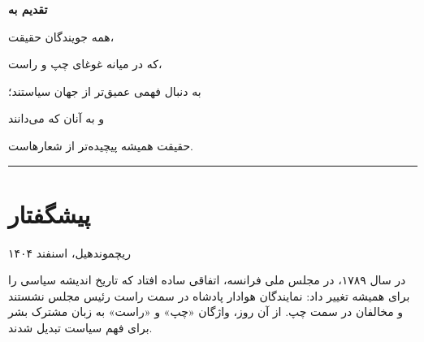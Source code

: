 \vspace*{\fill}

\cleardoublepage


\thispagestyle{empty}

\vspace*{4cm}

\begin{flushright}
\begin{minipage}{10cm}

{\Large\bfseries تقدیم به}

\vspace{20pt}

{\large
همه جویندگان حقیقت،

که در میانه غوغای چپ و راست،

به دنبال فهمی عمیق‌تر از جهان سیاستند؛

\vspace{15pt}

و به آنان که می‌دانند

حقیقت همیشه پیچیده‌تر از شعارهاست.
}

\vspace{40pt}

\textcolor{CenterGreen}{\rule{5cm}{1pt}}

\end{minipage}
\end{flushright}

\newpage


\chapter*{پیشگفتار}

\begin{flushright}
\textcolor{MediumGray}{\small ریچموندهیل، اسنفند ۱۴۰۴}
\end{flushright}

\vspace{10pt}

\lettrine[lines=3, lraise=0.1, nindent=0.5em]{\textcolor{RightBlue}{د}}{ر} 
سال ۱۷۸۹، در مجلس ملی فرانسه، اتفاقی ساده افتاد که تاریخ اندیشه سیاسی را برای همیشه تغییر داد: نمایندگان هوادار پادشاه در سمت راست رئیس مجلس نشستند و مخالفان در سمت چپ. از آن روز، واژگان «چپ» و «راست» به زبان مشترک بشر برای فهم سیاست تبدیل شدند.

